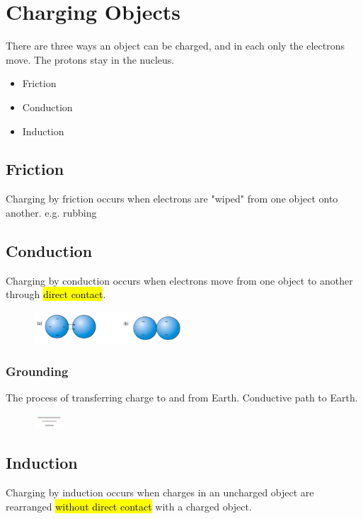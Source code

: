\documentclass[a4paper,12pt]{article}
\begin{document}
\pagebreak
\section{Charging Objects}
There are three ways an object can be charged, and in each only the electrons move. The protons stay in the nucleus.
\begin{itemize}
    \item{Friction}
    \item{Conduction}
    \item{Induction}
\end{itemize}

\subsection{Friction}
Charging by friction occurs when electrons are "wiped" from one object onto another. e.g. rubbing

\subsection{Conduction}
Charging by conduction occurs when electrons move from one object to another through \hl{direct contact}.

\begin{figure}[H]
    \centering
    \includegraphics[width=0.50\textwidth]{conduction}
\end{figure}

\subsubsection{Grounding}
The process of transferring charge to and from Earth. Conductive path to Earth.

\begin{figure}[H]
    \centering
    \includegraphics[width=0.1\textwidth]{ground}
\end{figure}

\subsection{Induction}
Charging by induction occurs when charges in an uncharged object are rearranged \hl{without direct contact} with a charged object.
\end{document}
